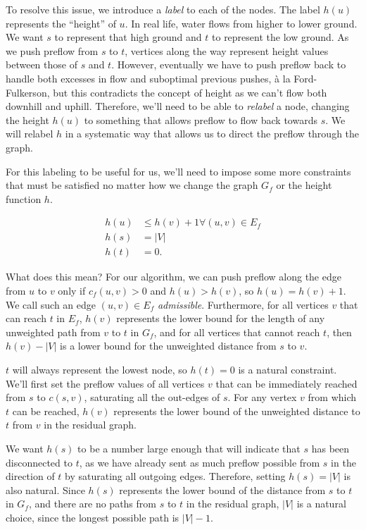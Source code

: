 To resolve this issue, we introduce a \textit{label} to each of the nodes. The label $h(u)$ represents the ``height'' of $u$. In real life, water flows from higher to lower ground. We want $s$ to represent that high ground and $t$ to represent the low ground. As we push preflow from $s$ to $t$, vertices along the way represent height values between those of $s$ and $t$. However, eventually we have to push preflow back to handle both excesses in flow and suboptimal previous pushes, \`{a} la Ford-Fulkerson, but this contradicts the concept of height as we can't flow both downhill and uphill. Therefore, we'll need to be able to \textit{relabel} a node, changing the height $h(u)$ to something that allows preflow to flow back towards $s$. We will relabel $h$ in a systematic way that allows us to direct the preflow through the graph.

For this labeling to be useful for us, we'll need to impose some more constraints that must be satisfied no matter how we change the graph $G_f$ or the height function $h$.

\begin{align*}
h(u) &\le h(v) + 1 \forall (u,v) \in E_f \\
h(s) &= |V| \\
h(t) &= 0.
\end{align*}

What does this mean? For our algorithm, we can push preflow along the edge from $u$ to $v$ only if $c_f(u,v) > 0$ and $h(u) > h(v)$, so $h(u) = h(v) + 1$. We call such an edge $(u,v) \in E_f$ \textit{admissible}. Furthermore, for all vertices $v$ that can reach $t$ in $E_f$, $h(v)$ represents the lower bound for the length of any unweighted path from $v$ to $t$ in $G_f$, and for all vertices that cannot reach $t$, then $h(v)-|V|$ is a lower bound for the unweighted distance from $s$ to $v$.

$t$ will always represent the lowest node, so $h(t)=0$ is a natural constraint. We'll first set the preflow values of all vertices $v$ that can be immediately reached from $s$ to $c(s,v)$, saturating all the out-edges of $s$. For any vertex $v$ from which $t$ can be reached, $h(v)$ represents the lower bound of the unweighted distance to $t$ from $v$ in the residual graph.

We want $h(s)$ to be a number large enough that will indicate that $s$ has been disconnected to $t$, as we have already sent as much preflow possible from $s$ in the direction of $t$ by saturating all outgoing edges. Therefore, setting $h(s)=|V|$ is also natural. Since $h(s)$ represents the lower bound of the distance from $s$ to $t$ in $G_f$, and there are no paths from $s$ to $t$ in the residual graph, $|V|$ is a natural choice, since the longest possible path is $|V|-1$.

